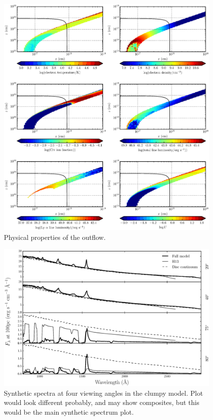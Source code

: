 \documentclass[useAMS,usenatbib]{mn2e_x}
\begin{document}
\begin{figure}
\centering
\includegraphics[width=1.0\textwidth]{figures/wind.eps}
\caption
{
Physical properties of the outflow.
}
\label{fig:uvspec}
\end{figure}

\begin{figure}
\centering
\includegraphics[width=1.0\textwidth]{figures/uvspec.eps}
\caption
{
Synthetic spectra at four viewing angles in the clumpy model. Plot would look different probably,
and may show composites, but this would be the main synthetic spectrum plot.
}
\label{fig:uvspec}
\end{figure}
\end{document}
